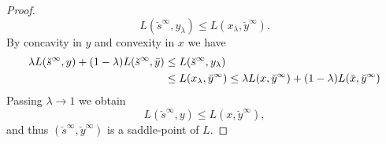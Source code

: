 \documentclass[11pt,onecolumn]{article}
\theoremstyle{remark}
\begin{document}
\begin{proof}
$$
L(\breve s^\infty, y_\lambda) \leq L(x_\lambda, \breve y^\infty).
$$
By concavity in $y$ and convexity in $x$ we have
\begin{align}
\lambda L(\breve s^\infty, y) + (1-\lambda) L(\breve s^\infty, \bar y)  &\leq L(\breve s^\infty, y_\lambda)\notag \\
&\leq L(x_\lambda, \breve y^\infty) \leq \lambda L(x, \breve y^\infty) + (1-\lambda) L( \bar x, \breve y^\infty)
\end{align}
Passing $\lambda \to 1$ we obtain
$$
 L(\breve s^\infty, y) \leq  L(x, \breve y^\infty),
$$
and thus $(\breve s^\infty, \breve y^\infty)$ is a saddle-point of $L$.
\end{proof}
\end{document}
